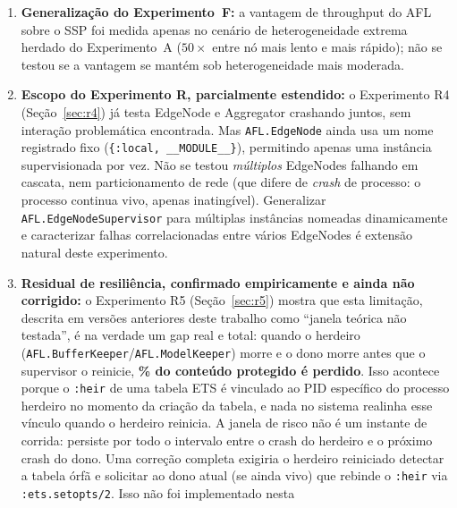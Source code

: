 \documentclass[conference,a4paper]{IEEEtran}
\begin{document}
\begin{enumerate}[noitemsep,leftmargin=*]
    peso fixo dentro de um horizonte finito de rodadas
    (Seção~\ref{sec:discussion_fedasync}), por herdar um passo de mistura
    $\mathcal{O}(1/t)$ da consistência com o FedAvg síncrono clássico. Isso
    não invalida as propriedades de convergência do AFL, mas é uma
    fraqueza real frente a alternativas com passo constante, não corrigida
    nesta versão.
  \item \textbf{Generalização do Experimento~F:} a vantagem de throughput
    do AFL sobre o SSP foi medida apenas no cenário de heterogeneidade
    extrema herdado do Experimento~A ($50\times$ entre nó mais lento e mais
    rápido); não se testou se a vantagem se mantém sob heterogeneidade mais
    moderada.
  \item \textbf{Escopo do Experimento R, parcialmente estendido:} o
    Experimento R4 (Seção~\ref{sec:r4}) já testa EdgeNode e Aggregator
    crashando juntos, sem interação problemática encontrada. Mas
    \texttt{AFL.EdgeNode} ainda usa um nome registrado fixo
    (\texttt{\{:local, \_\_MODULE\_\_\}}), permitindo apenas uma instância
    supervisionada por vez. Não se testou \emph{múltiplos} EdgeNodes
    falhando em cascata, nem particionamento de rede (que difere de
    \textit{crash} de processo: o processo continua vivo, apenas
    inatingível). Generalizar \texttt{AFL.EdgeNodeSupervisor} para múltiplas
    instâncias nomeadas dinamicamente e caracterizar falhas correlacionadas
    entre vários EdgeNodes é extensão natural deste experimento.
  \item \textbf{Residual de resiliência, confirmado empiricamente e ainda não
    corrigido:} o Experimento R5 (Seção~\ref{sec:r5}) mostra que esta
    limitação, descrita em versões anteriores deste trabalho como ``janela
    teórica não testada'', é na verdade um gap real e total: quando o
    herdeiro (\texttt{AFL.BufferKeeper}/\texttt{AFL.ModelKeeper}) morre e o
    dono morre antes que o supervisor o reinicie,
    \textbf{\statExpRFiveHeirDeadPct{}\% do conteúdo protegido é perdido}.
    Isso acontece porque o \texttt{:heir} de uma tabela ETS é vinculado ao PID
    específico do processo herdeiro no momento da criação da tabela, e
    nada no sistema realinha esse vínculo quando o herdeiro reinicia. A
    janela de risco não é um instante de corrida: persiste por todo o
    intervalo entre o crash do herdeiro e o próximo crash do dono. Uma
    correção completa exigiria o herdeiro reiniciado detectar a tabela
    órfã e solicitar ao dono atual (se ainda vivo) que rebinde o
    \texttt{:heir} via \texttt{:ets.setopts/2}. Isso não foi implementado nesta

\end{enumerate}
\end{document}
